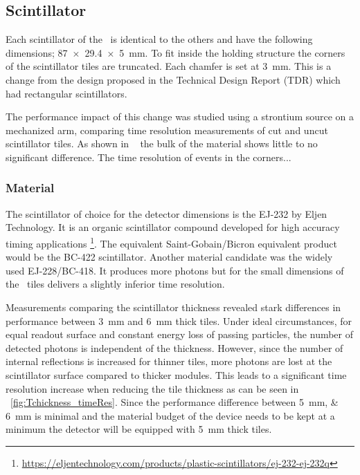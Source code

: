 \documentclass[../BTOF_summary.tex]{subfiles}
\begin{document}
\subsection{Scintillator}
Each scintillator of the \btofD\ is identical to the others and have the following dimensions; \SI{87 x 29.4 x 5}{mm}.
To fit inside the holding structure the corners of the scintillator tiles are truncated.
Each chamfer is set at \SI{3}{mm}.
This is a change from the design proposed in the Technical Design Report (TDR) which had rectangular scintillators.

The performance impact of this change was studied using a strontium source on a mechanized arm, comparing time resolution measurements of cut and uncut scintillator tiles.
As shown in \fig\  the bulk of the material shows little to no significant difference.
The time resolution of events in the corners... 

\subsubsection*{Material}
The scintillator of choice for the detector dimensions is the EJ-232 by Eljen Technology. It is an organic scintillator compound developed for high accuracy timing applications \footnote{\url{https://eljentechnology.com/products/plastic-scintillators/ej-232-ej-232q}}.
The equivalent Saint-Gobain/Bicron equivalent product would be the BC-422 scintillator.
Another material candidate was the widely used EJ-228/BC-418.
It produces more photons but for the small dimensions of the \btof\ tiles delivers a slightly inferior time resolution.

Measurements comparing the scintillator thickness revealed stark differences in performance between \SI{3}{mm} and \SI{6}{mm} thick tiles. 
Under ideal circumstances, for equal readout surface and constant energy loss of passing particles, the number of detected photons is independent of the thickness.
However, since the number of internal reflections is increased for thinner tiles, more photons are lost at the scintillator surface compared to thicker modules.
This leads to a significant time resolution increase when reducing the tile thickness as can be seen in \fig ~\ref{fig:Tchickness_timeRes}.
Since the performance difference between \SIlist[]{5;6}{mm} is minimal and the material budget of the device needs to be kept at a minimum the detector will be equipped with \SI{5}{mm} thick tiles.
\end{document}
